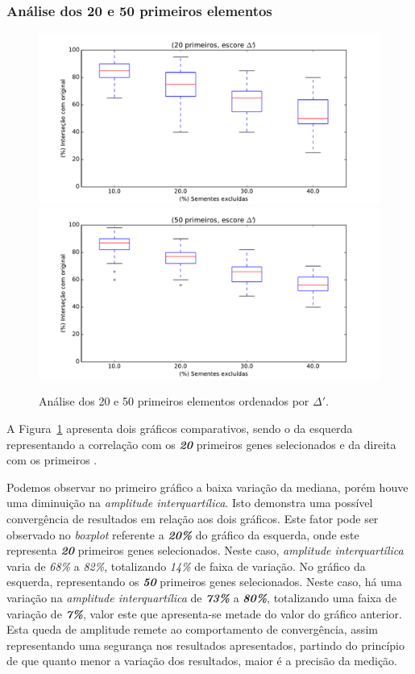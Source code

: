 \subsubsection{Análise dos 20 e 50 primeiros elementos}
\begin{figure}[ht!]
\includegraphics[width=1\textwidth]{Images/analyses/fig_S_20_40.pdf}
\includegraphics[width=1\textwidth]{Images/analyses/fig_S_50_40.pdf}
\caption {Análise dos 20 e 50 primeiros elementos ordenados por $\Delta'$.
\label{fig_S_20-50_40}}
\end{figure}
%

A Figura~\ref{fig_S_20-50_40} apresenta dois gráficos comparativos, sendo o da esquerda representando a correlação com os \textsl{\textbf{20}} primeiros genes selecionados e da direita com os primeiros . 
%

Podemos observar no primeiro gráfico a baixa variação da mediana, porém houve uma diminuição na \textit{amplitude interquartílica}. Isto demonstra uma possível convergência de resultados em relação aos dois gráficos. Este fator pode ser observado no \textit{boxplot} referente a \textbf{\textsl{20\%}} do gráfico da esquerda, onde este representa \textsl{\textbf{20}} primeiros genes selecionados. Neste caso, \textit{amplitude interquartílica} varia de \textit{68\%} a \textit{82\%}, totalizando \textit{14\%} de faixa de variação. No gráfico da esquerda, representando os \textbf{\textit{50}} primeiros genes selecionados. Neste caso, há uma variação na \textsl{amplitude interquartílica} de \textbf{\textsl{73\%}} a \textbf{\textsl{80\%}}, totalizando uma faixa de variação de \textbf{\textsl{7\%}}, valor este que apresenta-se metade do valor do gráfico anterior. Esta queda de amplitude remete ao comportamento de convergência, assim representando uma segurança nos resultados apresentados, partindo do princípio de que quanto menor a variação dos resultados, maior é a precisão da medição.
%

